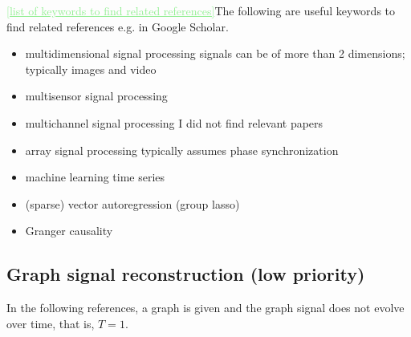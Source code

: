 \documentclass[11pt,final,onecolumn]{IEEEtran}
\newcommand{\cmt}[1]{\noindent\textcolor{lightgreen}{\underline{[#1]}}} %
\newcommand{\cmt}[1]{} %
\begin{document}
\cmt{list of keywords to find related references}The following are useful
keywords to find related references e.g. in Google Scholar.
\begin{itemize}
\item multidimensional signal processing \ra signals can be of more
  than 2 dimensions; typically images and video
\item multisensor signal processing
  \item multichannel signal processing \ra I did not find relevant papers
\item array signal processing \ra typically assumes phase
  synchronization
\item machine learning time series
\item (sparse) vector autoregression (group lasso)
\item Granger causality 
\end{itemize}


\subsection{Graph signal reconstruction (low priority)}
In the following references, a graph is given and the graph signal
does not evolve over time, that is, $T=1$.
\end{document}

